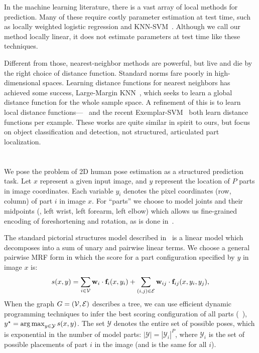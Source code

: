 In the machine learning literature, there is a vast array of local methods for 
prediction.  Many of these require costly parameter estimation at test time, 
such as locally weighted logistic regression and KNN-SVM~\citep{zhang06}.  
Although we call our method locally linear, it does not estimate parameters at 
test time like these techniques.

Different from those, nearest-neighbor methods are powerful, but live and die 
by the right choice of distance function.  Standard norms fare poorly in 
high-dimensional spaces.  Learning distance functions for nearest neighbors has 
achieved some success, \eg Large-Margin KNN~\citep{lmknn}, which seeks to learn 
a global distance function for the whole sample space.  A refinement of this is 
to learn local distance functions---~\citep{frome07} and the recent 
Exemplar-SVM~\citep{esvm} both learn distance functions per example.  These 
works are quite similar in spirit to ours, but focus on object classification 
and detection, not structured, articulated part localization.


\section{\LLPS}\label{sec:llps-model}

We pose the problem of 2D human pose estimation as a structured prediction 
task.  Let $x$ represent a given input image, and $y$ represent the location of 
$P$ parts in image coordinates.  Each variable $y_i$ denotes the pixel 
coordinates (row, column) of part $i$ in image $x$.  For ``parts'' we choose to 
model joints and their midpoints (\eg, left wrist, left forearm, left elbow) 
which allows us fine-grained encoding of foreshortening and rotation, as is 
done in~\citep{deva2011,sapp2011}.

The standard pictorial structures model described in~ is a linear 
model which decomposes into a sum of unary and pairwise linear terms.  We 
choose a general pairwise MRF form in which the score for a part configuration 
specified by $y$ in image $x$ is:
\begin{align}
 s(x,y) = \sum_{i \in \mathcal{V}} \mathbf{w}_i \cdot \mathbf{f}_i(x,y_i) + \sum_{(i,j) \in \mathcal{E}} 
\mathbf{w}_{ij} \cdot \mathbf{f}_{ij}(x,y_i,y_j),
 \label{eq:llps-ps}
\end{align}
When the graph $G = (\mathcal{V},\mathcal{E})$ describes a tree, we can use efficient dynamic 
programming techniques to infer the best scoring configuration of all parts 
(~), $y^\star = \mathop{\arg\max}_{y \in \mathcal{Y}} s(x,y)$.
The set $\mathcal{Y}$ denotes the entire set of possible poses, which is 
exponential in the number of model parts: $|\mathcal{Y}| = |\mathcal{Y}_i|^P$, 
where $\mathcal{Y}_i$ is the set of possible placements of part $i$ in the 
image (and is the same for all $i$).

